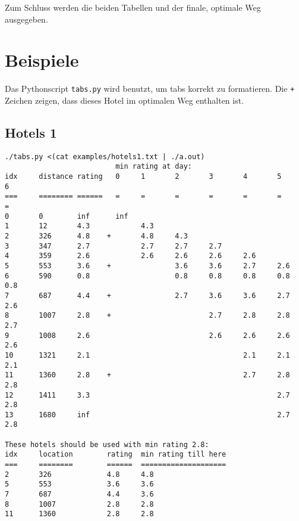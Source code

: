 \documentclass[a4paper,10pt,ngerman]{scrartcl}
\begin{document}
Zum Schluss werden die beiden Tabellen und der finale, optimale Weg ausgegeben.

\section{Beispiele}
Das Pythonscript \lstinline{tabs.py} wird benutzt, um tabs korrekt zu formatieren.
Die \lstinline{+} Zeichen zeigen, dass dieses Hotel im optimalen Weg enthalten ist.

\subsection*{Hotels 1}
\begin{lstlisting}
./tabs.py <(cat examples/hotels1.txt | ./a.out)
                          min rating at day:
idx     distance rating   0     1       2       3       4       5       6
===     ======== ======   =     =       =       =       =       =       =
0       0        inf      inf
1       12       4.3            4.3
2       326      4.8    +       4.8     4.3
3       347      2.7            2.7     2.7     2.7
4       359      2.6            2.6     2.6     2.6     2.6
5       553      3.6    +               3.6     3.6     2.7     2.6
6       590      0.8                    0.8     0.8     0.8     0.8     0.8
7       687      4.4    +               2.7     3.6     3.6     2.7     2.6
8       1007     2.8    +                       2.7     2.8     2.8     2.7
9       1008     2.6                            2.6     2.6     2.6     2.6
10      1321     2.1                                    2.1     2.1     2.1
11      1360     2.8    +                               2.7     2.8     2.8
12      1411     3.3                                            2.7     2.8
13      1680     inf                                            2.7     2.8

These hotels should be used with min rating 2.8:
idx     location        rating  min rating till here
===     ========        ======  ====================
2       326             4.8     4.8
5       553             3.6     3.6
7       687             4.4     3.6
8       1007            2.8     2.8
11      1360            2.8     2.8
\end{lstlisting}
\end{document}
